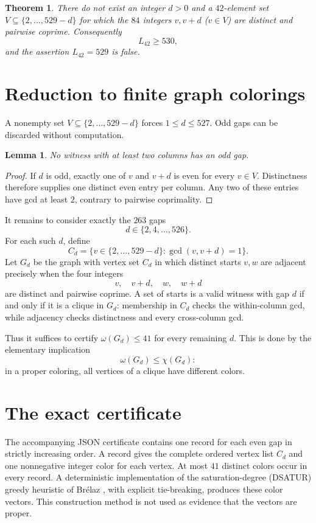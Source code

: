 \documentclass[11pt]{article}
\newtheorem{theorem}{Theorem}
\newtheorem{lemma}{Lemma}
\begin{document}
\begin{theorem}\label{thm:main}
There do not exist an integer $d>0$ and a $42$-element set
$V\subseteq\{2,\ldots,529-d\}$ for which the $84$ integers $v,v+d$
($v\in V$) are distinct and pairwise coprime.  Consequently
\[
 L_{42}\geq530,
\]
and the assertion $L_{42}=529$ is false.
\end{theorem}

\section{Reduction to finite graph colorings}

A nonempty set $V\subseteq\{2,\ldots,529-d\}$ forces
$1\leq d\leq527$.  Odd gaps can be discarded without computation.

\begin{lemma}\label{lem:odd}
No witness with at least two columns has an odd gap.
\end{lemma}

\begin{proof}
If $d$ is odd, exactly one of $v$ and $v+d$ is even for every $v\in V$.
Distinctness therefore supplies one distinct even entry per column.  Any two
of these entries have gcd at least $2$, contrary to pairwise coprimality.
\end{proof}

It remains to consider exactly the $263$ gaps
\[
 d\in\{2,4,\ldots,526\}.
\]
For each such $d$, define
\[
 C_d=\{v\in\{2,\ldots,529-d\}:\gcd(v,v+d)=1\}.
\]
Let $G_d$ be the graph with vertex set $C_d$ in which distinct starts $v,w$
are adjacent precisely when the four integers
\[
 v,\quad v+d,\quad w,\quad w+d
\]
are distinct and pairwise coprime.  A set of starts is a valid witness with
gap $d$ if and only if it is a clique in $G_d$: membership in $C_d$ checks
the within-column gcd, while adjacency checks distinctness and every
cross-column gcd.

Thus it suffices to certify $\omega(G_d)\leq41$ for every remaining $d$.
This is done by the elementary implication
\[
 \omega(G_d)\leq\chi(G_d):
\]
in a proper coloring, all vertices of a clique have different colors.

\section{The exact certificate}

The accompanying JSON certificate contains one record for each even gap in
strictly increasing order.  A record gives the complete ordered vertex list
$C_d$ and one nonnegative integer color for each vertex.  At most $41$
distinct colors occur in every record.  A deterministic implementation of
the saturation-degree (DSATUR) greedy heuristic of Br\'elaz
\cite{Brelaz1979}, with explicit tie-breaking, produces these color vectors.
This construction method is not used as evidence that the vectors are proper.
\end{document}
